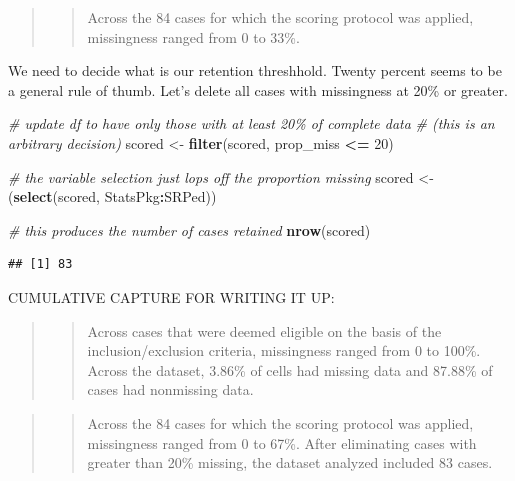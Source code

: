 \documentclass[
  11pt,
]{book}
\newenvironment{Shaded}{\begin{snugshade}}{\end{snugshade}}
\newcommand{\CommentTok}[1]{\textcolor[rgb]{0.37,0.37,0.37}{\textit{#1}}}
\newcommand{\DecValTok}[1]{\textcolor[rgb]{0.06,0.06,0.06}{#1}}
\newcommand{\FunctionTok}[1]{\textcolor[rgb]{0.27,0.27,0.27}{\textbf{#1}}}
\newcommand{\NormalTok}[1]{#1}
\newcommand{\OtherTok}[1]{\textcolor[rgb]{0.37,0.37,0.37}{#1}}
\newcommand{\SpecialCharTok}[1]{\textcolor[rgb]{0.43,0.43,0.43}{\textbf{#1}}}
\begin{document}
\begin{quote}
\begin{quote}
Across the 84 cases for which the scoring protocol was applied, missingness ranged from 0 to 33\%.
\end{quote}
\end{quote}

We need to decide what is our retention threshhold. Twenty percent seems to be a general rule of thumb. Let's delete all cases with missingness at 20\% or greater.

\begin{Shaded}
\begin{Highlighting}[]
\CommentTok{\# update df to have only those with at least 20\% of complete data}
\CommentTok{\# (this is an arbitrary decision)}
\NormalTok{scored }\OtherTok{\textless{}{-}} \FunctionTok{filter}\NormalTok{(scored, prop\_miss }\SpecialCharTok{\textless{}=} \DecValTok{20}\NormalTok{)}

\CommentTok{\# the variable selection just lops off the proportion missing}
\NormalTok{scored }\OtherTok{\textless{}{-}}\NormalTok{ (}\FunctionTok{select}\NormalTok{(scored, StatsPkg}\SpecialCharTok{:}\NormalTok{SRPed))}

\CommentTok{\# this produces the number of cases retained}
\FunctionTok{nrow}\NormalTok{(scored)}
\end{Highlighting}
\end{Shaded}

\begin{verbatim}
## [1] 83
\end{verbatim}

CUMULATIVE CAPTURE FOR WRITING IT UP:

\begin{quote}
\begin{quote}
Across cases that were deemed eligible on the basis of the inclusion/exclusion criteria, missingness ranged from 0 to 100\%. Across the dataset, 3.86\% of cells had missing data and 87.88\% of cases had nonmissing data.
\end{quote}
\end{quote}

\begin{quote}
\begin{quote}
Across the 84 cases for which the scoring protocol was applied, missingness ranged from 0 to 67\%. After eliminating cases with greater than 20\% missing, the dataset analyzed included 83 cases.
\end{quote}
\end{quote}
\end{document}
